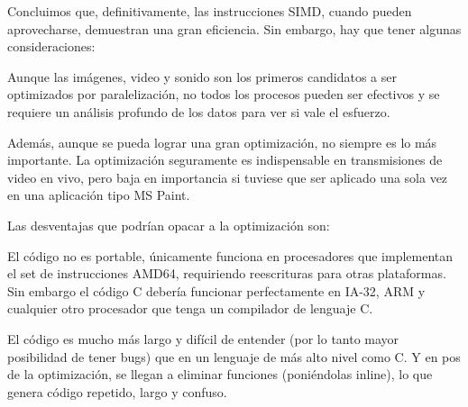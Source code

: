 \documentclass[a4paper,10pt,twoside]{article}
\begin{document}
Concluimos que, definitivamente, las instrucciones SIMD, cuando pueden aprovecharse, demuestran una gran eficiencia. Sin embargo, hay que tener algunas consideraciones:

Aunque las imágenes, video y sonido son los primeros candidatos a ser optimizados por paralelización, no todos los procesos pueden ser efectivos y se requiere un análisis profundo de los datos para ver si vale el esfuerzo.

Además, aunque se pueda lograr una gran optimización, no siempre es lo más importante. La optimización seguramente es indispensable en transmisiones de video en vivo, pero baja en importancia si tuviese que ser aplicado una sola vez en una aplicación tipo MS Paint.

Las desventajas que podrían opacar a la optimización son:

El código no es portable, únicamente funciona en procesadores que implementan el set de instrucciones AMD64, requiriendo reescrituras para otras plataformas. Sin embargo el código C debería funcionar perfectamente en IA-32, ARM y cualquier otro procesador que tenga un compilador de lenguaje C.

El código es mucho más largo y difícil de entender (por lo tanto mayor posibilidad de tener bugs) que en un lenguaje de más alto nivel como C. Y en pos de la optimización, se llegan a eliminar funciones (poniéndolas inline), lo que genera código repetido, largo y confuso.
\end{document}
